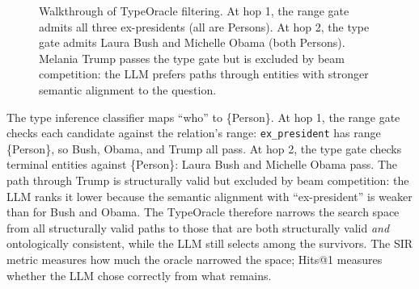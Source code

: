 \begin{figure}[htpb]
{
  }%
  \caption[Walkthrough of TypeOracle filtering for a 2-hop question]{Walkthrough of
  TypeOracle filtering. At hop 1, the range gate admits all three ex-presidents (all
  are Persons). At hop 2, the type gate admits Laura Bush and Michelle Obama (both
  Persons). Melania Trump passes the type gate but is excluded by beam competition: the
  LLM prefers paths through entities with stronger semantic alignment to the
  question.}
  \label{fig:walkthrough}
\end{figure}

The type inference classifier maps ``who'' to \{Person\}. At hop 1, the range gate
checks each candidate against the relation's range: \texttt{ex\_president} has range
\{Person\}, so Bush, Obama, and Trump all pass. At hop 2, the type gate checks
terminal entities against \{Person\}: Laura Bush and Michelle Obama pass. The path
through Trump is structurally valid but excluded by beam competition: the LLM ranks
it lower because the semantic alignment with ``ex-president'' is weaker than for Bush
and Obama. The TypeOracle therefore narrows the search space from all
structurally valid paths to those that are both structurally valid \textit{and}
ontologically consistent, while the LLM still selects among the survivors. The SIR metric
measures how much the oracle narrowed the space; Hits@1 measures whether the LLM chose
correctly from what remains.

